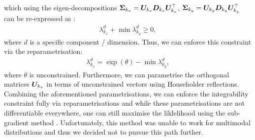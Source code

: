 \documentclass[a4paper,12pt,twoside,openright]{report}
\theoremstyle{definition}
\begin{document}
which using the eigen-decompositions ${\bm{\Sigma}}_{k_x}={\bm{U}}_{k_x} {\bm{D}}_{k_x} {\bm{U}}^{\top}_{k_x}$,  ${\bm{\Sigma}}_{k_y}={\bm{U}}_{k_y} {\bm{D}}_{k_y} {\bm{U}}^{\top}_{k_y}$ can be re-expressed as : 
\begin{align*}
  \lambda_{k_x}^d + \min\lambda_{k_y}^d \geq 0,
\end{align*}
where $d$ is a specific component / dimension. Thus, we can enforce this constraint via the reparametrisation:
\begin{align*}
   \lambda_{k_x}^d = \exp(\theta) - \min\lambda_{k_y}^d ,
\end{align*}
where  $\theta$ is unconstrained. Furthermore, we can parametrise the orthogonal matrices ${\bm{U}}_{k_x}$ in terms of unconstrained vectors using Householder reflections. Combining the aforementioned parametrisations, we can enforce the integrability constraint fully via reparametrisations and while these parametrisations are not differentiable everywhere, one can still maximise the liklelihood using the sub-gradient method \citep{shor1991development}. Unfortunately, this method was unable to work for multimodal distributions and thus we decided not to pursue this path further.


 
 
\end{document}
